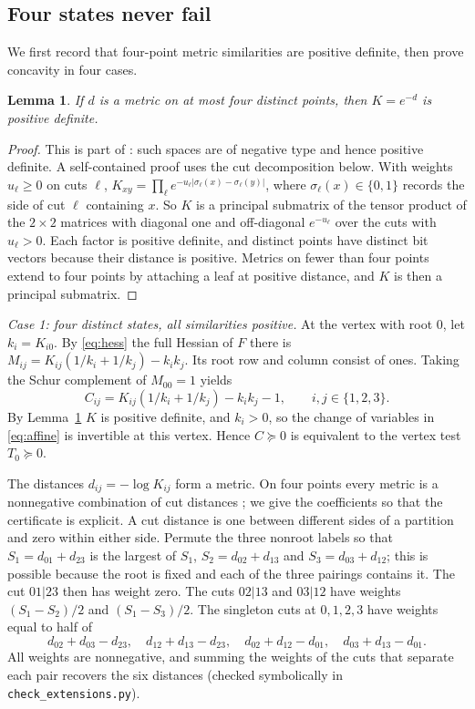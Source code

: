 \documentclass[11pt,a4paper]{article}
\newtheorem{lemma}[theorem]{Lemma}
\theoremstyle{remark}
\begin{document}
\subsection{Four states never fail}\label{sec:four}
We first record that four-point metric similarities are positive definite, then prove concavity in four cases.

\begin{lemma}\label{lem:pd4}
If $d$ is a metric on at most four distinct points, then $K=e^{-d}$ is positive definite.
\end{lemma}
\begin{proof}
This is part of \cite[Theorem 3.6(4)]{meckes}: such spaces are of negative type and hence positive definite. A self-contained proof uses the cut decomposition below. With weights $u_\ell\ge0$ on cuts $\ell$, $K_{xy}=\prod_\ell e^{-u_\ell|\sigma_\ell(x)-\sigma_\ell(y)|}$, where $\sigma_\ell(x)\in\{0,1\}$ records the side of cut $\ell$ containing $x$. So $K$ is a principal submatrix of the tensor product of the $2\times2$ matrices with diagonal one and off-diagonal $e^{-u_\ell}$ over the cuts with $u_\ell>0$. Each factor is positive definite, and distinct points have distinct bit vectors because their distance is positive. Metrics on fewer than four points extend to four points by attaching a leaf at positive distance, and $K$ is then a principal submatrix.
\end{proof}

\emph{Case 1: four distinct states, all similarities positive.} At the vertex with root $0$, let $k_i=K_{i0}$. By \eqref{eq:hess} the full Hessian of $F$ there is $M_{ij}=K_{ij}(1/k_i+1/k_j)-k_i k_j$. Its root row and column consist of ones. Taking the Schur complement of $M_{00}=1$ yields
\begin{equation}\label{eq:schur}
 C_{ij}=K_{ij}(1/k_i+1/k_j)-k_i k_j-1,\qquad i,j\in\{1,2,3\}.
\end{equation}
By Lemma~\ref{lem:pd4} $K$ is positive definite, and $k_i>0$, so the change of variables in \eqref{eq:affine} is invertible at this vertex. Hence $C\succeq0$ is equivalent to the vertex test $T_0\succeq0$.

The distances $d_{ij}=-\log K_{ij}$ form a metric. On four points every metric is a nonnegative combination of cut distances \cite{dl}; we give the coefficients so that the certificate is explicit. A cut distance is one between different sides of a partition and zero within either side. Permute the three nonroot labels so that $S_1=d_{01}+d_{23}$ is the largest of $S_1$, $S_2=d_{02}+d_{13}$ and $S_3=d_{03}+d_{12}$; this is possible because the root is fixed and each of the three pairings contains it. The cut $01|23$ then has weight zero. The cuts $02|13$ and $03|12$ have weights $(S_1-S_2)/2$ and $(S_1-S_3)/2$. The singleton cuts at $0,1,2,3$ have weights equal to half of
\[
 d_{02}+d_{03}-d_{23},\quad d_{12}+d_{13}-d_{23},\quad
 d_{02}+d_{12}-d_{01},\quad d_{03}+d_{13}-d_{01}.
\]
All weights are nonnegative, and summing the weights of the cuts that separate each pair recovers the six distances (checked symbolically in \texttt{check\_extensions.py}).
\end{document}
